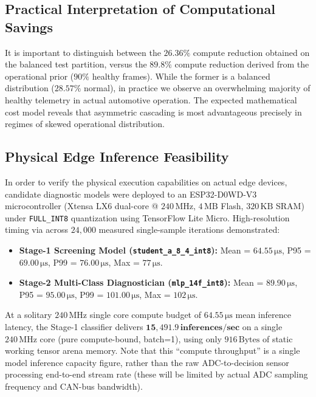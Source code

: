 \documentclass[journal]{IEEEtran}
\begin{document}
\subsection{Practical Interpretation of Computational Savings}
It is important to distinguish between the $26.36\%$ compute reduction obtained on the balanced test partition, versus the $89.8\%$ compute reduction derived from the operational prior ($90\%$ healthy frames). While the former is a balanced distribution ($28.57\%$ normal), in practice we observe an overwhelming majority of healthy telemetry in actual automotive operation. The expected mathematical cost model reveals that asymmetric cascading is most advantageous precisely in regimes of skewed operational distribution.

\subsection{Physical Edge Inference Feasibility}
In order to verify the physical execution capabilities on actual edge devices, candidate diagnostic models were deployed to an ESP32-D0WD-V3 microcontroller (Xtensa LX6 dual-core @ $240\,\text{MHz}$, $4\,\text{MB}$ Flash, $320\,\text{KB}$ SRAM) under \texttt{FULL\_INT8} quantization using TensorFlow Lite Micro. High-resolution timing via  across $24,000$ measured single-sample iterations demonstrated:
\begin{itemize}
    \item \textbf{Stage-1 Screening Model (\texttt{student\_a\_8\_4\_int8}):} Mean = $64.55\,\si{\micro\second}$, P95 = $69.00\,\si{\micro\second}$, P99 = $76.00\,\si{\micro\second}$, Max = $77\,\si{\micro\second}$.
    \item \textbf{Stage-2 Multi-Class Diagnostician (\texttt{mlp\_14f\_int8}):} Mean = $89.90\,\si{\micro\second}$, P95 = $95.00\,\si{\micro\second}$, P99 = $101.00\,\si{\micro\second}$, Max = $102\,\si{\micro\second}$.
\end{itemize}
At a solitary $240\,\text{MHz}$ single core compute budget of $64.55\,\si{\micro\second}$ mean inference latency, the Stage-1 classifier delivers $\mathbf{15,491.9\,\text{inferences/sec}}$ on a single $240\,\text{MHz}$ core (pure compute-bound, batch=1), using only $916\,\text{Bytes}$ of static working tensor arena memory. Note that this ``compute throughput'' is a single model inference capacity figure, rather than the raw ADC-to-decision sensor processing end-to-end stream rate (these will be limited by actual ADC sampling frequency and CAN-bus bandwidth).
\end{document}
